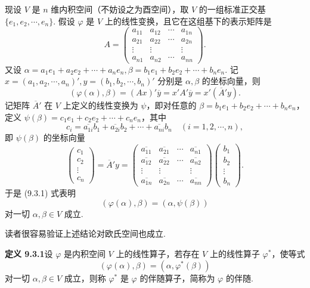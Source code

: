 \documentclass[UTF8,12pt,a4paper,fontset=fandol]{ctexart}
\begin{document}
现设 $V$ 是 $n$ 维内积空间（不妨设之为酉空间），取 $V$ 的一组标准正交基 $\{e_1,e_2,\cdots,e_n\}$. 假设 $\varphi$ 是 $V$ 上的线性变换，且它在这组基下的表示矩阵是
\[
  A=
  \left(\begin{array}{cccc}
    a_{11} & a_{12} & \cdots & a_{1n}\\
    a_{21} & a_{22} & \cdots & a_{2n}\\
    \vdots & \vdots & & \vdots\\
    a_{n1} & a_{n2} & \cdots & a_{nn}
  \end{array}\right).
\]
又设 $\alpha=a_1e_1+a_2e_2+\cdots+a_ne_n,\beta=b_1e_1+b_2e_2+\cdots+b_ne_n$. 记 $x=(a_1,a_2,\cdots,a_n)',y=(b_1,b_2,\cdots,b_n)'$ 分别是 $\alpha,\beta$ 的坐标向量，则
\begin{equation}
  (\varphi(\alpha),\beta)=(Ax)'\overline y=x'A'\overline y=x'(\overline A'y).
  \tag{9.3.1}
\end{equation}
记矩阵 $\overline A'$ 在 $V$ 上定义的线性变换为 $\psi$，即对任意的 $\beta=b_1e_1+b_2e_2+\cdots+b_ne_n$，定义 $\psi(\beta)=c_1e_1+c_2e_2+\cdots+c_ne_n$，其中
\[
  c_i=\overline{a_{1i}}b_1+\overline{a_{2i}}b_2+\cdots+\overline{a_{ni}}b_n\quad(i=1,2,\cdots,n),
\]
即 $\psi(\beta)$ 的坐标向量
\[
  \left(\begin{array}{c}
    c_1\\ c_2\\ \vdots\\ c_n
  \end{array}\right)
  =\overline A'y
  =
  \left(\begin{array}{cccc}
    \overline{a_{11}} & \overline{a_{21}} & \cdots & \overline{a_{n1}}\\
    \overline{a_{12}} & \overline{a_{22}} & \cdots & \overline{a_{n2}}\\
    \vdots & \vdots & & \vdots\\
    \overline{a_{1n}} & \overline{a_{2n}} & \cdots & \overline{a_{nn}}
  \end{array}\right)
  \left(\begin{array}{c}
    b_1\\ b_2\\ \vdots\\ b_n
  \end{array}\right).
\]
于是 (9.3.1) 式表明
\[
  (\varphi(\alpha),\beta)=(\alpha,\psi(\beta))
\]
对一切 $\alpha,\beta\in V$ 成立.

读者很容易验证上述结论对欧氏空间也成立.

\noindent\textbf{定义 9.3.1}\quad 设 $\varphi$ 是内积空间 $V$ 上的线性算子，若存在 $V$ 上的线性算子 $\varphi^*$，使等式
\[
  (\varphi(\alpha),\beta)=(\alpha,\varphi^*(\beta))
\]
对一切 $\alpha,\beta\in V$ 成立，则称 $\varphi^*$ 是 $\varphi$ 的伴随算子，简称为 $\varphi$ 的伴随.
\end{document}
